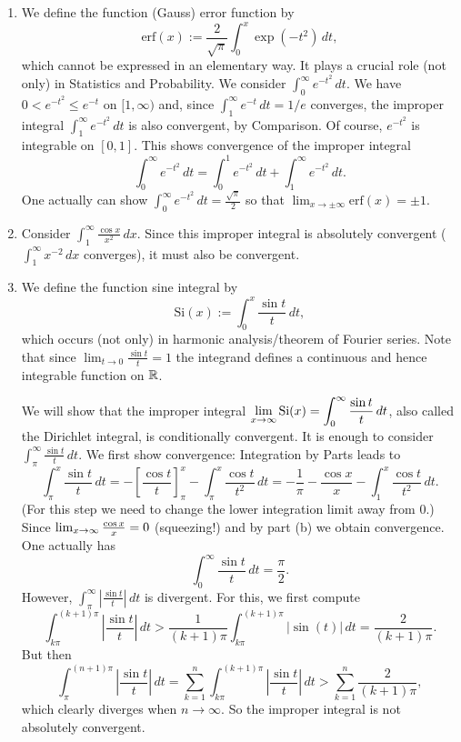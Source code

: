 \documentclass[10pt, a4paper]{article}
\begin{document}
\begin{enumerate}[label = (\alph*)]
    \item We define the function
    (Gauss)
    error function by
    \[
    \mathrm{erf}(x) := \frac{2}{\sqrt{\pi}}\int_{0}^{x}\exp(-t ^ 2)\,dt,
    \]
    which cannot be expressed in an elementary way.
    It plays a crucial role
    (not only)
    in Statistics and Probability.
    We consider $\int_{0}^{\infty}e ^ {-t ^ 2}\,dt$.
    We have $0 < e ^ {-t ^ 2} \leq e ^ {-t}$ on $[1, \infty)$ and,
    since $\int_{1}^{\infty}e ^ {-t}\,dt = 1 / e$ converges,
    the improper integral $\int_{1}^{\infty}e ^ {-t ^ 2}\,dt$ is also convergent,
    by Comparison.
    Of course,
    $e ^ {-t ^ 2}$ is integrable on $[0, 1]$.
    This shows convergence of the improper integral
    \[
    \int_{0}^{\infty}e ^ {-t ^ 2}\,dt = \int_{0}^{1}e ^ {-t ^ 2}\,dt + \int_{1}^{\infty}e ^ {-t ^ 2}\,dt.
    \]
    One actually can show $\int_{0}^{\infty}e ^ {-t ^ 2}\,dt = \frac{\sqrt{\pi}}{2}$ so that $\lim_{x \rightarrow \pm\infty}\mathrm{erf}(x) = \pm 1$.

    \item Consider $\displaystyle\int_{1}^{\infty}\frac{\cos{x}}{x ^ 2}\,dx$.
    Since this improper integral is absolutely convergent
    ($\int_{1}^{\infty}x ^ {-2}\,dx$ converges),
    it must also be convergent.

    \item We define the function sine integral by
    \[
    \mathrm{Si}(x) := \int_{0}^{x}\frac{\sin{t}}{t}\,dt,
    \]
    which occurs
    (not only)
    in harmonic analysis/theorem of Fourier series.
    Note that since $\lim_{t \rightarrow 0}\frac{\sin{t}}{t} = 1$ the integrand defines a continuous and hence integrable function on $\R$.

    We will show that the improper integral $\displaystyle\liminfty[x]\mathrm{Si}(x) = \int_{0}^{\infty}\frac{\sin{t}}{t}\,dt$,
    also called the Dirichlet integral,
    is conditionally convergent.
    It is enough to consider $\int_{\pi}^{\infty}\frac{\sin{t}}{t}\,dt$.
    We first show convergence:
    Integration by Parts leads to
    \[
    \int_{\pi}^{x}\frac{\sin{t}}{t}\,dt = -\left[\frac{\cos{t}}{t}\right]_{\pi}^{x} - \int_{\pi}^{x}\frac{\cos{t}}{t ^ 2}\,dt = -\frac{1}{\pi} - \frac{\cos{x}}{x} - \int_{1}^{x}\frac{\cos{t}}{t ^ 2}\,dt.
    \]
    (For this step we need to change the lower integration limit away from $0$.)
    Since $\liminfty[x]\frac{\cos{x}}{x} = 0$
    (squeezing!)
    and by part (b) we obtain convergence.
    One actually has
    \[
    \int_{0}^{\infty}\frac{\sin{t}}{t}\,dt = \frac{\pi}{2}.
    \]
    However,
    $\displaystyle\int_{\pi}^{\infty}\left|\frac{\sin{t}}{t}\right|\,dt$ is divergent.
    For this,
    we first compute
    \[
    \int_{k\pi}^{(k + 1)\pi}\left|\frac{\sin{t}}{t}\right|\,dt > \frac{1}{(k + 1)\pi}\int_{k\pi}^{(k + 1)\pi}|\sin(t)|\,dt = \frac{2}{(k + 1)\pi}.
    \]
    But then
    \[
    \int_{\pi}^{(n + 1)\pi}\left|\frac{\sin{t}}{t}\right|\,dt = \sum_{k = 1}^{n}\int_{k\pi}^{(k + 1)\pi}\left|\frac{\sin{t}}{t}\right|\,dt > \sum_{k = 1}^{n}\frac{2}{(k + 1)\pi},
    \]
    which clearly diverges when $n \rightarrow \infty$.
    So the improper integral is not absolutely convergent.
\end{enumerate}
\end{document}
